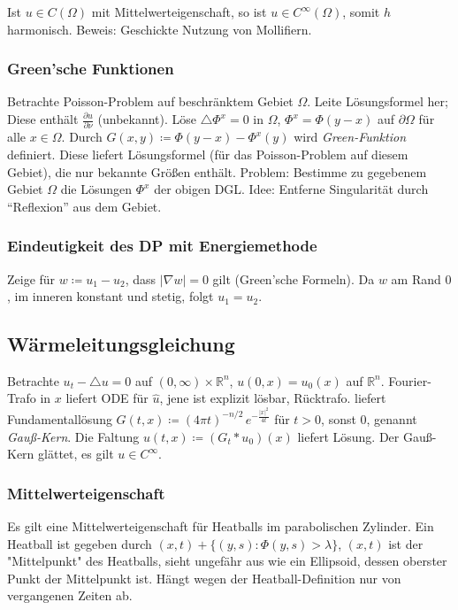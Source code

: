 \documentclass[11pt,a4paper]{scrartcl}
\newcommand{\R}{\mathbb{R}} %
\newcommand{\laplace}{\triangle}
\theoremstyle{plain}
\theoremstyle{definition}
\theoremstyle{remark}
\begin{document}
Ist $u\in C(\Omega)$ mit Mittelwerteigenschaft, so ist $u\in C^\infty(\Omega)$, somit $h$ harmonisch. Beweis: Geschickte Nutzung von Mollifiern.

\subsubsection{Green'sche Funktionen}

Betrachte Poisson-Problem auf beschränktem Gebiet $\Omega$. Leite Lösungsformel her; Diese enthält $\frac{\partial u}{\partial \nu}$ (unbekannt). Löse $\laplace \Phi^x = 0$ in $\Omega$, $\Phi^x = \Phi(y-x)$ auf $\partial \Omega$ für alle $x\in\Omega$. Durch $G(x,y)\coloneqq \Phi(y-x)-\Phi^x(y)$ wird \emph{Green-Funktion} definiert. Diese liefert Lösungsformel (für das Poisson-Problem auf diesem Gebiet), die nur bekannte Größen enthält. Problem: Bestimme zu gegebenem Gebiet $\Omega$ die Lösungen $\Phi^x$ der obigen DGL. Idee: Entferne Singularität durch \enquote{Reflexion} aus dem Gebiet.

\subsubsection{Eindeutigkeit des DP mit Energiemethode}

Zeige für $w\coloneqq u_1-u_2$, dass $|\nabla w|=0$ gilt (Green'sche Formeln). Da $w$ am Rand $0$, im inneren konstant und stetig, folgt $u_1=u_2$.

\subsection{Wärmeleitungsgleichung}

Betrachte $u_t-\triangle u = 0$ auf $(0,\infty)\times \R^n$, $u(0,x)=u_0(x)$ auf $\R^n$. Fourier-Trafo in $x$ liefert ODE für $\hat u$, jene ist explizit lösbar, Rücktrafo. liefert Fundamentallösung $G(t,x)\coloneqq (4\pi t)^{-n/2} \, e^{-\frac{|x|^2}{4t}}$ für $t>0$, sonst $0$, genannt \emph{Gauß-Kern}. Die Faltung $u(t,x)\coloneqq (G_t*u_0)(x)$ liefert Lösung. Der Gauß-Kern glättet, es gilt $u\in C^\infty$.

\subsubsection{Mittelwerteigenschaft}

Es gilt eine Mittelwerteigenschaft für Heatballs im parabolischen Zylinder. Ein Heatball ist gegeben durch $(x,t) + \{(y,s): \Phi(y,s) > \lambda\}$, $(x,t)$ ist der "Mittelpunkt" des Heatballs, sieht ungefähr aus wie ein Ellipsoid, dessen oberster Punkt der Mittelpunkt ist. Hängt wegen der Heatball-Definition nur von vergangenen Zeiten ab.
\end{document}
